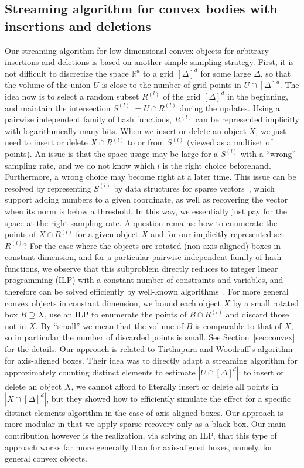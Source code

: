\documentclass[11pt]{article}
\def\Real{\mathbb{R}}
\let\R\Real
\begin{document}
\subsection{Streaming algorithm for convex bodies with insertions and deletions}
Our streaming algorithm for low-dimensional convex objects for arbitrary insertions and deletions is based on another simple sampling strategy. First, it is not difficult to discretize the space $\R^d$ to a grid $[\Delta]^d$ for some large $\Delta$, so that the volume of the union $U$ is close to the number of grid points in $U \cap [\Delta]^d$. The idea now is to select a random subset $R^{(l)}$ of the grid $[\Delta]^d$ in the beginning, and maintain the intersection $S^{(l)} := U \cap R^{(l)}$ during the updates. Using a pairwise independent family of hash functions, $R^{(l)}$ can be represented implicitly with logarithmically many bits.
%
When we insert or delete an object $X$, we just need to insert or delete $X \cap R^{(l)}$ to or from $S^{(l)}$ (viewed as a multiset of points).
An issue is that the space usage may be large for a $S^{(l)}$ with a ``wrong'' sampling rate, and we do not know which $l$ is the right choice beforehand. Furthermore, a wrong choice may become right at a later time.
This issue can be resolved by representing $S^{(l)}$ by data structures for sparse vectors~\cite{FrahlingIS08,JowhariST11}, which support adding numbers to a given coordinate, as well as recovering the vector when its norm is below a threshold. In this way, we essentially just pay for the space at the right sampling rate.
%
A question remains: how to enumerate the points of $X \cap R^{(l)}$ for a given object $X$ and for our implicitly represented set $R^{(l)}$? For the case where the objects are rotated (non-axis-aligned) boxes in constant dimension, and for a particular pairwise independent family of hash functions, we observe that this subproblem directly reduces to integer linear programming (ILP) with a constant number of constraints and variables, and therefore can be solved efficiently by well-known algorithms~\cite{Lenstra83}.
For more general convex objects in constant dimension, we bound each object $X$ by a small rotated box $B \supseteq X$, use an ILP to enumerate the points of $B \cap R^{(l)}$ and discard those not in $X$. By ``small'' we mean that the volume of $B$ is comparable to that of $X$, so in particular the number of discarded points is small. See Section~\ref{sec:convex} for the details.
%
Our approach is related to Tirthapura and Woodruff's algorithm~\cite{TW12} for axis-aligned boxes. Their idea was to directly adapt a streaming algorithm for approximately counting distinct elements to estimate $|U\cap [\Delta]^d|$: 
to insert or delete an object $X$, we cannot afford to literally insert or delete all points in $|X\cap [\Delta]^d|$, but they showed how to efficiently simulate the effect for a specific distinct elements algorithm in the case of axis-aligned boxes.
Our approach is more modular in that we apply sparse recovery only as a black box.
Our main contribution however is the realization, via solving an ILP, that this type of approach works far more generally than for axis-aligned boxes, namely, for general convex objects.
%
\end{document}
